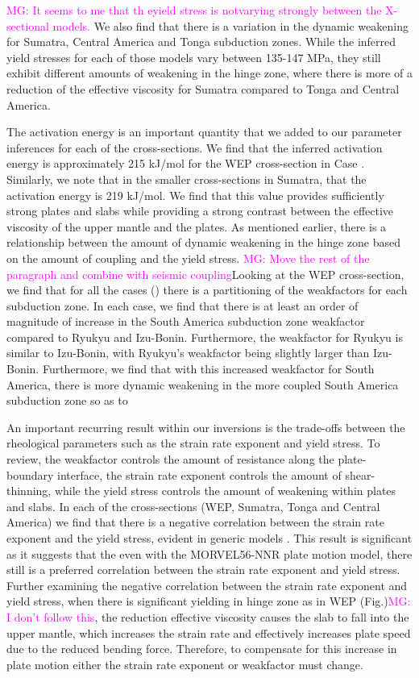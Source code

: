 \documentclass[12pt]{article}
\newcommand{\mgnote}[1]{\textcolor{magenta}{MG: #1}}
\begin{document}
{\mgnote{It seems to me that th eyield stress is notvarying strongly between the X-sectional models.}
We also find that there is a variation in the dynamic weakening for Sumatra, Central America and Tonga subduction zones. While the inferred yield stresses for each of those models vary between 135-147 MPa, they still exhibit different amounts of weakening in the hinge zone, where there is more of a reduction of the effective viscosity for Sumatra compared to Tonga and Central America.
  
  The activation energy is an important quantity that we added to our parameter inferences for each of the cross-sections. We find that the inferred activation energy is approximately 215 kJ/mol for the WEP cross-section in Case . Similarly, we note that in the smaller cross-sections in Sumatra, that the activation energy is 219 kJ/mol. We find that this value provides sufficiently strong plates and slabs while providing a strong contrast between the effective viscosity of the upper mantle and the plates. As mentioned earlier, there is a relationship between the amount of dynamic weakening in the hinge zone based on the amount of coupling and the yield stress. \mgnote{Move the rest of the paragraph and combine with seismic coupling}Looking at the WEP cross-section, we find that for all the cases () there is a partitioning of the weakfactors for each subduction zone. In each case, we find that there is at least an order of magnitude of increase in the South America subduction zone weakfactor compared to Ryukyu and Izu-Bonin. Furthermore, the weakfactor for Ryukyu is similar to Izu-Bonin, with Ryukyu's weakfactor being slightly larger than Izu-Bonin. Furthermore, we find that with this increased weakfactor for South America, there is more dynamic weakening in the more coupled South America subduction zone so as to 
  
  An important recurring result within our inversions is the trade-offs between the rheological parameters such as the strain rate exponent and yield stress. To review, the weakfactor controls the amount of resistance along the plate-boundary  interface, the strain rate exponent controls the amount of shear-thinning, while the yield stress controls the amount of weakening within plates and slabs. In each of the cross-sections (WEP, Sumatra, Tonga and Central America) we find that there is a negative correlation between the strain rate exponent and the yield stress, evident in generic models \citep{ratnaswamy2015adjoint}. This result is significant as it suggests that the even with the MORVEL56-NNR plate motion model, there still is a preferred correlation between the strain rate exponent and yield stress. Further examining the negative correlation between the strain rate exponent and yield stress, when there is significant yielding in hinge zone as in WEP (Fig.)\mgnote{I don't follow this}, the reduction effective viscosity causes the slab to fall into the upper mantle, which increases the strain rate and effectively increases plate speed due to the reduced bending force. Therefore, to compensate for this increase in plate motion either the strain rate exponent or weakfactor must change.
  
}
\end{document}
